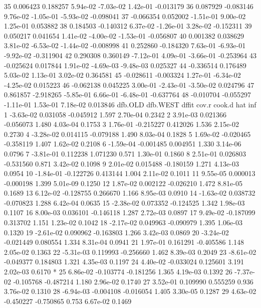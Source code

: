 \begin{Schunk}
\begin{Soutput}
35  0.006423  0.188257  5.94e-02 -7.03e-02  1.42e-01 -0.013179
36  0.087929 -0.083146  9.76e-02 -1.05e-01 -5.93e-02 -0.098041
37 -0.066354  0.052002 -1.51e-01  9.00e-02  1.25e-01  0.053882
38  0.184503 -0.140312  6.37e-02 -1.26e-01  3.28e-02 -0.152311
39  0.050217  0.041654  1.41e-02 -4.00e-02 -1.53e-01 -0.056807
40  0.001382  0.038629  3.81e-02 -6.53e-02 -1.44e-02 -0.008998
41  0.252860 -0.184320  7.63e-01 -6.93e-01 -9.92e-02 -0.311904
42  0.290308  0.360149 -7.12e-01  4.09e-01 -3.66e-01 -0.253964
43 -0.025624  0.017844  1.91e-02 -4.69e-03 -9.48e-03  0.025327
44 -0.336514  0.176489  5.03e-02  1.13e-01  3.02e-02  0.364581
45 -0.028611 -0.003324  1.27e-01 -6.34e-02 -4.25e-02  0.015223
46 -0.062138  0.045225  3.00e-01 -2.43e-01 -3.50e-02  0.024796
47  0.861857 -2.918265 -5.85e-01  6.66e-01 -6.48e-01 -0.637764
48 -0.010704 -0.055297 -1.11e-01  1.53e-01  7.18e-02  0.013846
     dfb.OLD  dfb.WEST     dffit cov.r   cook.d    hat inf
1  -3.63e-02  0.031058 -0.045912 1.597 2.70e-04 0.2342    
2   3.91e-03  0.021366 -0.056073 1.480 4.03e-04 0.1753    
3   1.76e-01 -0.215227  0.412026 1.536 2.15e-02 0.2730    
4  -3.28e-02  0.014115 -0.079188 1.490 8.03e-04 0.1828    
5   1.69e-02 -0.020465 -0.358119 1.407 1.62e-02 0.2108    
6  -1.59e-04 -0.001485  0.004951 1.330 3.14e-06 0.0796    
7  -3.81e-01  0.112238  1.071230 0.571 1.30e-01 0.1860    
8   2.51e-01  0.026803 -0.531560 0.871 3.42e-02 0.1098    
9   2.01e-02  0.015488 -0.180159 1.271 4.13e-03 0.0954    
10 -1.84e-01 -0.122726  0.413144 1.004 2.11e-02 0.1011    
11  9.55e-05  0.000013 -0.000198 1.399 5.01e-09 0.1250    
12  1.87e-02  0.002122 -0.026210 1.472 8.81e-05 0.1689    
13  6.12e-02 -0.128755  0.266670 1.166 8.95e-03 0.0910    
14 -1.63e-02  0.038732 -0.070823 1.288 6.42e-04 0.0635    
15 -2.38e-02  0.073352 -0.124525 1.342 1.98e-03 0.1107    
16  8.00e-03  0.036101 -0.146118 1.287 2.72e-03 0.0897    
17  9.49e-02 -0.187099  0.313702 1.151 1.23e-02 0.1042    
18 -2.17e-02  0.049963 -0.090979 1.395 1.06e-03 0.1320    
19 -2.61e-02  0.090962 -0.163803 1.266 3.42e-03 0.0869    
20 -3.24e-02 -0.021449  0.080554 1.334 8.31e-04 0.0941    
21  1.97e-01  0.161291 -0.405586 1.148 2.05e-02 0.1363    
22 -5.31e-03  0.119993 -0.256660 1.462 8.39e-03 0.2049    
23 -8.61e-02 -0.049377  0.184803 1.321 4.35e-03 0.1197    
24  4.40e-02 -0.033024  0.125601 3.191 2.02e-03 0.6170   *
25  6.86e-02 -0.103774 -0.181256 1.365 4.19e-03 0.1392    
26 -7.37e-02 -0.105768 -0.487214 1.180 2.96e-02 0.1740    
27  3.52e-01  0.109990  0.555259 0.936 3.76e-02 0.1310    
28 -6.94e-03 -0.004108 -0.016054 1.405 3.30e-05 0.1287    
29  4.63e-02 -0.450227 -0.750865 0.753 6.67e-02 0.1469    

\end{Soutput}
\end{Schunk}
